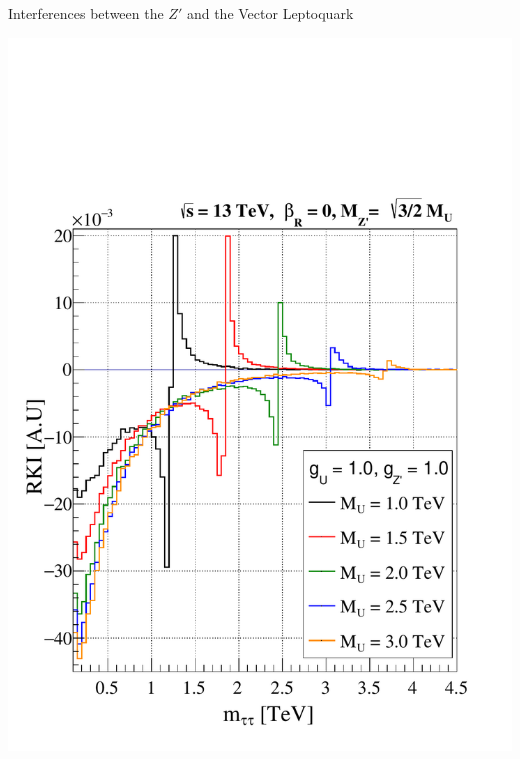\documentclass{../bredelebeamer}
\begin{document}
\begin{frame}{Interferences between the $Z'$ and the Vector Leptoquark}
\begin{minipage}{.50\linewidth}
		\includegraphics[width=.9\linewidth]{../2023_paper/Kinematic_Interference_gu_1.0_gzp_1.0_zp_upper_limit_woRHC.pdf}
        $$ $$ 
        $$ $$
	\end{minipage}
	
\end{frame}
\end{document}
